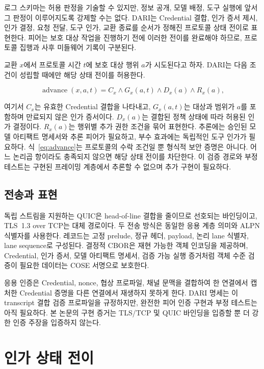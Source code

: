 \documentclass[10pt]{article}
\begin{document}
로그 스키마는 허용 판정을 기술할 수 있지만, 정보 공개, 모델 배정, 도구 실행에 앞서 그 판정이 이루어지도록 강제할 수는 없다. DARI는 Credential 결합, 인가 증서 제시, 인가 결정, 요청 전달, 도구 인가, 교환 종료를 순서가 정해진 프로토콜 상태 전이로 표현한다. 피어는 보호 대상 작업을 진행하기 전에 이러한 전이를 완료해야 하므로, 프로토콜 집행과 사후 미들웨어 기록이 구분된다.

교환 $x$에서 프로토콜 시간 $t$에 보호 대상 행위 $a$가 시도된다고 하자. DARI는 다음 조건이 성립할 때에만 해당 상태 전이를 허용한다.

\begin{equation}
\operatorname{advance}(x,a,t) = C_x \land G_x(a,t)
  \land D_x(a) \land R_x(a),
\label{eq:advance}
\end{equation}

여기서 $C_x$는 유효한 Credential 결합을 나타내고, $G_x(a,t)$는 대상과 범위가 $a$를 포함하며 만료되지 않은 인가 증서이다. $D_x(a)$는 결합된 정책 상태에 따라 허용된 인가 결정이다. $R_x(a)$는 행위별 추가 권한 조건을 묶어 표현한다. 추론에는 승인된 모델 아티팩트 명세서와 추론 피어가 필요하고, 부수 효과에는 독립적인 도구 인가가 필요하다. 식~\ref{eq:advance}는 프로토콜의 수락 조건일 뿐 형식적 보안 증명은 아니다. 어느 논리곱 항이라도 충족되지 않으면 해당 상태 전이를 차단한다. 이 검증 경로와 부정 테스트는 구현된 프레이밍 계층에서 추론할 수 없으며 추가 구현이 필요하다.

\subsection{전송과 표현}

독립 스트림을 지원하는 QUIC은 head-of-line 결합을 줄이므로 선호되는 바인딩이고, TLS~1.3 over TCP는 대체 경로이다. 두 전송 방식은 동일한 응용 계층 의미와 ALPN 식별자를 사용한다. 레코드는 고정 prelude, 정규 헤더, payload, 논리 lane 식별자, lane sequence로 구성된다. 결정적 CBOR은 재현 가능한 객체 인코딩을 제공하며, Credential, 인가 증서, 모델 아티팩트 명세서, 검증 가능 실행 증거처럼 객체 수준 검증이 필요한 데이터는 COSE 서명으로 보호한다.

응용 인증은 Credential, nonce, 협상 프로파일, 채널 문맥을 결합하여 한 연결에서 캡처한 Credential 증명을 다른 연결에서 재생하지 못하게 한다. DARI 명세는 이 transcript 결합 검증 프로파일을 규정하지만, 완전한 피어 인증 구현과 부정 테스트는 아직 필요하다. 본 논문의 구현 증거는 TLS/TCP 및 QUIC 바인딩을 입증할 뿐 더 강한 인증 주장을 입증하지 않는다.

\section{인가 상태 전이}
\end{document}
